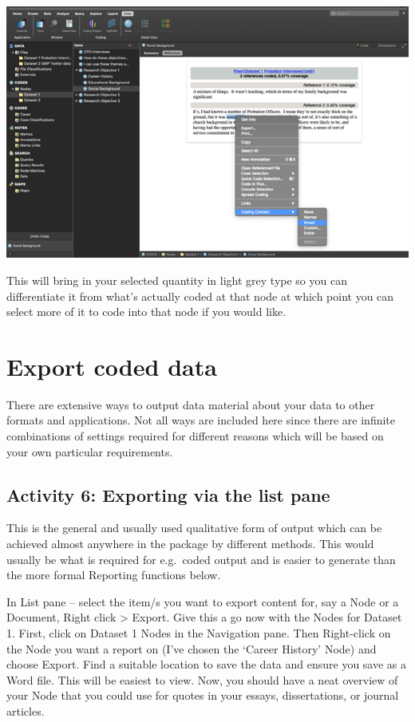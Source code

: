 \documentclass[
]{book}
\begin{document}
\includegraphics{imgs/coding_broad.png}

This will bring in your selected quantity in light grey type so you can differentiate it from what's actually coded at that node at which point you can select more of it to code into that node if you would like.

\hypertarget{export-coded-data}{%
\section{Export coded data}\label{export-coded-data}}

There are extensive ways to output data material about your data to other formats and applications. Not all ways are included here since there are infinite combinations of settings required for different reasons which will be based on your own particular requirements.

\hypertarget{activity-6-exporting-via-the-list-pane}{%
\subsection{Activity 6: Exporting via the list pane}\label{activity-6-exporting-via-the-list-pane}}

This is the general and usually used qualitative form of output which can be achieved almost anywhere in the package by different methods. This would usually be what is required for e.g.~coded output and is easier to generate than the more formal Reporting functions below.

In List pane -- select the item/s you want to export content for, say a Node or a Document, Right click \textgreater{} Export. Give this a go now with the Nodes for Dataset 1. First, click on Dataset 1 Nodes in the Navigation pane. Then Right-click on the Node you want a report on (I've chosen the `Career History' Node) and choose Export. Find a suitable location to save the data and ensure you save as a Word file. This will be easiest to view. Now, you should have a neat overview of your Node that you could use for quotes in your essays, dissertations, or journal articles.
\end{document}
